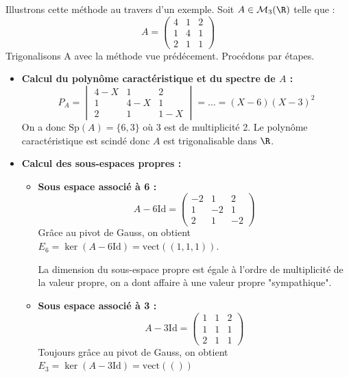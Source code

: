 \begin{example}[Trigonalisation]
    Illustrons cette méthode au travers d'un exemple. 
    Soit $A \in \mathcal{M}_3(\R)$ telle que :
        \[ A = 
            \begin{pmatrix}
                4 & 1 & 2 \\ 
                1 & 4 & 1 \\ 
                2 & 1 & 1 
            \end{pmatrix}
        \]
    Trigonalisons A avec la méthode vue prédécement. Procédons par étapes. 

    \begin{itemize}
        \item \textbf{Calcul du polynôme caractéristique et du spectre de $A$ :}
        \[
            P_A = \begin{vmatrix}
                        4-X & 1 & 2 \\ 
                        1 & 4-X & 1 \\ 
                        2 & 1 & 1-X 
                    \end{vmatrix} 
                = \dots = (X-6)(X-3)^2
        \]
        On a donc $\text{Sp}(A) = \{6,3\}$ où 3 est de multiplicité 2. 
        Le polynôme caractéristique est scindé donc $A$ est trigonalisable dans $\R$. 

        \item \textbf{Calcul des sous-espaces propres :}
            \begin{itemize}
                \item \textbf{Sous espace associé à 6 :}
                \[ A - 6 \text{Id} = 
                    \begin{pmatrix}
                        -2 & 1 & 2 \\ 
                        1 & -2 & 1 \\ 
                        2 & 1 & -2 
                    \end{pmatrix}
                \]
                Grâce au pivot de Gauss, on obtient $E_6 = \ker (A - 6 \text{Id}) = \text{vect}((1,1,1))$. 

                La dimension du sous-espace propre est égale à l'ordre de multiplicité de la valeur propre, 
                on a dont affaire à une valeur propre "sympathique". 
                \item \textbf{Sous espace associé à 3 :}
                \[ A - 3 \text{Id} = 
                    \begin{pmatrix}
                        1 & 1 & 2 \\
                        1 & 1 & 1 \\ 
                        2 & 1 & 1 
                    \end{pmatrix}
                \]
                Toujours grâce au pivot de Gauss, on obtient $E_3 = \ker (A - 3 \text{Id}) = \text{vect}(())$ 
            \end{itemize}
    \end{itemize}
\end{example}
